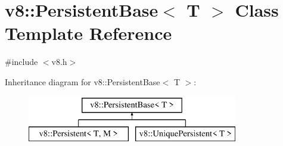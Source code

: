 \hypertarget{classv8_1_1_persistent_base}{}\section{v8\+:\+:Persistent\+Base$<$ T $>$ Class Template Reference}
\label{classv8_1_1_persistent_base}


{\ttfamily \#include $<$v8.\+h$>$}

Inheritance diagram for v8\+:\+:Persistent\+Base$<$ T $>$\+:\begin{figure}[H]
\begin{center}
\leavevmode
\includegraphics[height=2.000000cm]{classv8_1_1_persistent_base}
\end{center}
\end{figure}
